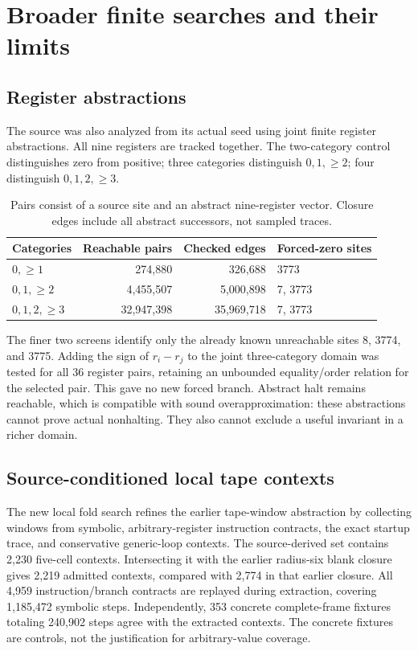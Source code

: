 \documentclass[11pt,letterpaper]{article}
\begin{document}
\section{Broader finite searches and their limits}

\subsection{Register abstractions}

The source was also analyzed from its actual seed using joint finite
register abstractions. All nine registers are tracked together. The
two-category control distinguishes zero from positive; three categories
distinguish $0,1,\ge2$; four distinguish $0,1,2,\ge3$.

\begin{table}[ht]
\centering
\begin{tabular}{@{}lrrl@{}}
\toprule
Categories & Reachable pairs & Checked edges & Forced-zero sites\\
\midrule
$0,\ge1$ &274,880&326,688&3773\\
$0,1,\ge2$ &4,455,507&5,000,898&7, 3773\\
$0,1,2,\ge3$ &32,947,398&35,969,718&7, 3773\\
\bottomrule
\end{tabular}
\caption{Pairs consist of a source site and an abstract nine-register
vector. Closure edges include all abstract successors, not sampled traces.}
\end{table}

The finer two screens identify only the already known unreachable sites
8, 3774, and 3775. Adding the sign of $r_i-r_j$ to the joint three-category
domain was tested for all 36 register pairs, retaining an unbounded
equality/order relation for the selected pair. This gave no new forced
branch. Abstract halt remains reachable, which is compatible with sound
overapproximation: these abstractions cannot prove actual nonhalting.
They also cannot exclude a useful invariant in a richer domain.

\subsection{Source-conditioned local tape contexts}

The new local fold search refines the earlier tape-window abstraction by
collecting windows from symbolic, arbitrary-register instruction contracts,
the exact startup trace, and conservative generic-loop contexts. The
source-derived set contains 2,230 five-cell contexts. Intersecting it with
the earlier radius-six blank closure gives 2,219 admitted contexts, compared
with 2,774 in that earlier closure. All 4,959 instruction/branch
contracts are replayed during extraction, covering 1,185,472 symbolic
steps. Independently, 353 concrete complete-frame fixtures totaling
240,902 steps agree with the extracted contexts. The concrete fixtures
are controls, not the justification for arbitrary-value coverage.
\end{document}
